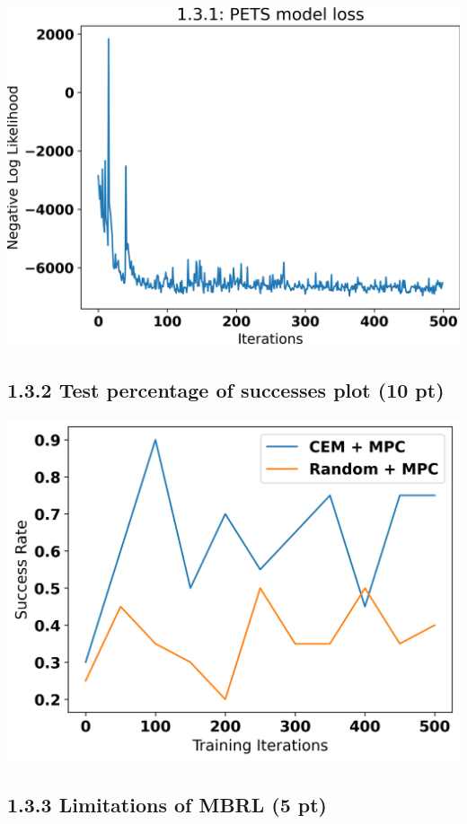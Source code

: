 \documentclass[12pt]{article}
\begin{document}
\begin{tcolorbox}[fit,height=30em, width=40em, blank, borderline={1pt}{1pt},nobeforeafter]
\begin{center}
    \includegraphics[width=40em]{1.3.1-loss}
\end{center}
\end{tcolorbox}

\subsection*{1.3.2 Test percentage of successes plot (10 pt)}

\begin{tcolorbox}[fit,height=30em, width=40em, blank, borderline={1pt}{1pt},nobeforeafter]
\begin{center}
    \includegraphics[width=40em]{2-cem-vs-random-Success Rate}
\end{center}
\end{tcolorbox}

\subsection*{1.3.3 Limitations of MBRL (5 pt)}

\begin{tcolorbox}[fit,height=20em, width=40em, blank, borderline={1pt}{1pt},nobeforeafter]
\begin{center}
\end{center}
\end{tcolorbox}
\end{document}
